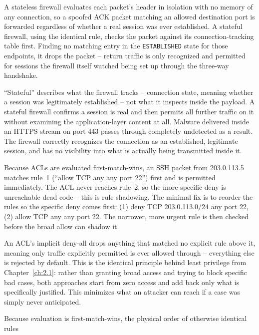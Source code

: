 \begin{answerkey}
\item A stateless firewall evaluates each packet's header in isolation with no memory of any
connection, so a spoofed ACK packet matching an allowed destination port is forwarded regardless of
whether a real session was ever established. A stateful firewall, using the identical rule, checks
the packet against its connection-tracking table first. Finding no matching entry in the
\texttt{ESTABLISHED} state for those endpoints, it drops the packet -- return traffic is only
recognized and permitted for sessions the firewall itself watched being set up through the
three-way handshake.
\item ``Stateful'' describes what the firewall tracks -- connection state, meaning whether a session
was legitimately established -- not what it inspects inside the payload. A stateful firewall
confirms a session is real and then permits all further traffic on it without examining the
application-layer content at all. Malware delivered inside an HTTPS stream on port 443 passes
through completely undetected as a result. The firewall correctly recognizes the connection as an
established, legitimate session, and has no visibility into what is actually being transmitted
inside it.
\item Because ACLs are evaluated first-match-wins, an SSH packet from 203.0.113.5 matches rule~1
(``allow TCP any any port 22'') first and is permitted immediately. The ACL never reaches rule~2, so
the more specific deny is unreachable dead code -- this is rule shadowing. The minimal fix is to
reorder the rules so the specific deny comes first: (1) deny TCP 203.0.113.0/24 any port 22, (2)
allow TCP any any port 22. The narrower, more urgent rule is then checked before the broad allow can
shadow it.
\item An ACL's implicit deny-all drops anything that matched no explicit rule above it, meaning
only traffic explicitly permitted is ever allowed through -- everything else is rejected by default.
This is the identical principle behind least privilege from Chapter~\ref{ch:2.1}: rather than
granting broad access and trying to block specific bad cases, both approaches start from zero
access and add back only what is specifically justified. This minimizes what an attacker can reach
if a case was simply never anticipated.
\item Because evaluation is first-match-wins, the physical order of otherwise identical rules

\end{answerkey}
